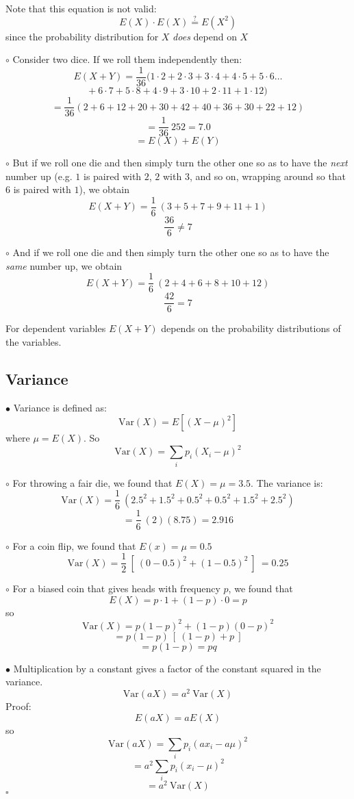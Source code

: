 \documentclass[11pt, oneside]{article}
\begin{document}
Note that this equation is not valid:
\[ E(X) \cdot E(X) \stackrel{?}{=} E(X^2) \]
since the probability distribution for $X$ \emph{does} depend on $X$

$\circ$ Consider two dice.  If we roll them independently then:
\[ E(X + Y) = \frac{1}{36} (1 \cdot 2 + 2 \cdot 3 + 3 \cdot 4 + 4 \cdot 5 + 5 \cdot 6 \dots \]
\[ + \ 6 \cdot 7 + 5 \cdot 8 + 4 \cdot 9 + 3 \cdot 10 + 2 \cdot 11 + 1 \cdot 12) \]
\[ =  \frac{1}{36} (2 + 6 + 12 + 20 + 30 + 42 + 40 + 36 + 30 + 22 + 12) \]
\[ = \frac{1}{36} \ 252 = 7.0 \]
\[ = E(X) + E(Y) \]

$\circ$ But if we roll one die and then simply turn the other one so as to have the \emph{next} number up (e.g. $1$ is paired with $2$, $2$ with $3$, and so on, wrapping around so that $6$ is paired with $1$), we obtain
\[ E(X + Y) = \frac{1}{6} \ (3 + 5 + 7 + 9 + 11 + 1) \] 
\[ \frac{36}{6} \ne 7 \]

$\circ$ And if we roll one die and then simply turn the other one so as to have the \emph{same} number up, we obtain
\[ E(X + Y) = \frac{1}{6} \ (2 + 4 + 6 + 8 + 10 + 12) \] 
\[ \frac{42}{6} = 7 \]

For dependent variables $E(X+Y)$ depends on the probability distributions of the variables.

\subsection*{Variance}
$\bullet$ Variance is defined as:
\[ \text{Var}(X) = E[(X - \mu)^2 ] \]
where $\mu = E(X)$.  So
\[ \text{Var}(X) = \sum_i p_i (X_i - \mu)^2 \]

$\circ$ For throwing a fair die, we found that $E(X) = \mu = 3.5$.  The variance is:
\[ \text{Var}(X) = \frac{1}{6} \ (2.5^2 + 1.5^2 + 0.5^2 + 0.5^2 + 1.5^2 + 2.5^2) \]
\[ = \frac{1}{6} \ (2) (8.75) = 2.916 \]

$\circ$ For a coin flip, we found that $E(x) = \mu = 0.5$ 
\[ \text{Var}(X) = \frac{1}{2} \ [ \ (0-0.5)^2 + (1-0.5)^2 \ ] \  = 0.25 \]

$\circ$ For a biased coin that gives heads with frequency $p$, we found that
\[ E(X) = p \cdot 1 + (1-p) \cdot 0 = p \]
so
\[ \text{Var}(X) = p (1-p)^2 + (1-p)(0 - p)^2 \]
\[ = p(1-p) \ [ \ (1-p) + p \ ] \]
\[ = p(1-p) = pq \]

$\bullet$ Multiplication by a constant gives a factor of the constant squared in the variance.
\[ \text{Var}(aX) = a^2 \ \text{Var}(X) \]
Proof:
\[ E(aX) = aE(X) \]
so
\[ \text{Var}(aX) = \sum_i p_i (ax_i - a \mu)^2 \]
\[ = a^2  \sum_i p_i (x_i - \mu)^2 \]
\[ = a^2 \ \text{Var}(X) \]
$\square$
\end{document}
